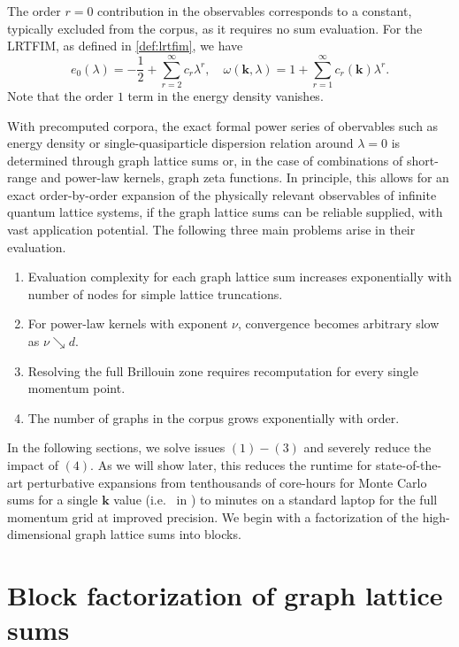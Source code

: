 \documentclass[]{amsart}
\numberwithin{mythm}{section}
\begin{document}
\begin{remark}
The order $r=0$ contribution in the observables corresponds to a constant, typically excluded from the corpus, as it requires no sum evaluation. For the LRTFIM, as defined in \cref{def:lrtfim}, we have
\[
e_0(\lambda)=-\frac{1}{2}+\sum_{r=2}^\infty c_r \lambda^r,\quad \omega(\bm k,\lambda)= 1+\sum_{r=1}^\infty c_r(\bm k) \lambda^r.
\]
Note that the order $1$ term in the energy density vanishes.
\end{remark}

With precomputed corpora, the exact formal power series of obervables such as energy density or single-quasiparticle dispersion relation around $\lambda=0$ is determined through graph lattice sums or, in the case of combinations of short-range and power-law kernels, graph zeta functions.
In principle, this allows for an exact order-by-order expansion of the physically relevant observables of infinite quantum lattice systems, if the graph lattice sums can be reliable supplied, with vast application potential. The following three main problems arise in their evaluation.

\begin{enumerate}
    \item Evaluation complexity for each graph lattice sum increases exponentially with number of nodes for simple lattice truncations. 
    \item    For power-law kernels with exponent $\nu$, convergence becomes arbitrary slow as $\nu\searrow d$.
    \item Resolving the full Brillouin zone requires recomputation for every single momentum point.
    \item The number of graphs in the corpus grows exponentially with order.
\end{enumerate}

In the following sections, we solve issues $(1)-(3)$ and severely reduce the impact of $(4)$. As we will show later, this reduces the runtime for state-of-the-art perturbative expansions from tenthousands of core-hours for Monte Carlo sums for a single $\bm k$ value (i.e.~ in \cite{adelhardt2024monte}) to minutes on a standard laptop for the full momentum grid at improved precision. We begin with a factorization of the high-dimensional graph lattice sums into blocks.

\section{Block factorization of graph lattice sums}
\label{sec:block_factorization}
\end{document}
